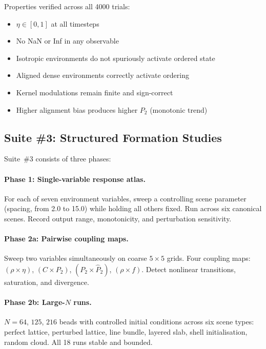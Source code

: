 \documentclass[11pt]{article}
\begin{document}
Properties verified across all 4000 trials:
\begin{itemize}
    \item $\eta \in [0, 1]$ at all timesteps
    \item No NaN or Inf in any observable
    \item Isotropic environments do not spuriously activate ordered state
    \item Aligned dense environments correctly activate ordering
    \item Kernel modulations remain finite and sign-correct
    \item Higher alignment bias produces higher $P_2$ (monotonic trend)
\end{itemize}

\subsection{Suite \#3: Structured Formation Studies}

Suite~\#3 consists of three phases:

\paragraph{Phase 1: Single-variable response atlas.}
For each of seven environment variables, sweep a controlling scene
parameter (spacing, from 2.0 to 15.0) while holding all others fixed.
Run across six canonical scenes.  Record output range, monotonicity, and
perturbation sensitivity.

\paragraph{Phase 2a: Pairwise coupling maps.}
Sweep two variables simultaneously on coarse $5 \times 5$ grids.  Four
coupling maps: $(\rho \times \eta)$, $(C \times P_2)$,
$(P_2 \times \hat{P}_2)$, $(\rho \times f)$.  Detect nonlinear
transitions, saturation, and divergence.

\paragraph{Phase 2b: Large-$N$ runs.}
$N = 64$, $125$, $216$ beads with controlled initial conditions across six
scene types: perfect lattice, perturbed lattice, line bundle, layered slab,
shell initialisation, random cloud.  All 18 runs stable and bounded.

\end{document}
